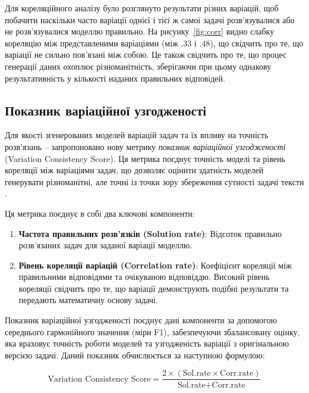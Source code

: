 Для кореляційного аналізу було розглянуто результати різних варіацій, щоб побачити наскільки часто варіації однієї і тієї ж самої задачі розв'язувалися або не розв'язувалися моделлю правильно. На рисунку~\ref{fig:corr} видно слабку кореляцію між представленими варіаціями (між .33 і .48), що свідчить про те, що варіації не сильно пов'язані між собою. Це також свідчить про те, що процес генерації даних охоплює різноманітність, зберігаючи при цьому однакову результативність у кількості наданих правильних відповідей.

\subsection{Показник варіаційної узгодженості}

Для якості згенерованих моделей варіацій задач та їх впливу на точність розв'язань -- запропоновано нову метрику \textit{показник варіаційної узгодженості} (Variation Consistency Score). Ця метрика поєднує точність моделі та рівень кореляції між варіаціями задач, що дозволяє оцінити здатність моделей генерувати різноманітні, але точні із точки зору збереження сутності задачі тексти \cite{nikolaiev2025synth}.

Ця метрика поєднує в собі два ключові компоненти:

\begin{enumerate}
    \item \textbf{Частота правильних розв’язків (Solution rate)}: Відсоток правильно розв'язаних задач для заданої варіації моделлю.
    \item \textbf{Рівень кореляції варіацій (Correlation rate)}: Коефіцієнт кореляції між правильними відповідями та очікуваною відповіддю. Високий рівень кореляції свідчить про те, що варіації демонструють подібні результати та передають математичну основу задачі.
\end{enumerate}

Показник варіаційної узгодженості поєднує дані компоненти за допомогою середнього гармонійного значення (міри F1), забезпечуючи збалансовану оцінку, яка враховує точність роботи моделей та узгодженість варіації з оригінальною версією задачі. Даний показник обчислюється за наступною формулою:

\begin{equation}
\text{Variation Consistency Score} = \frac{2 \times (\text{Sol.rate} \times \text{Corr.rate})}{\text{Sol.rate} + \text{Corr.rate}}
\end{equation}

